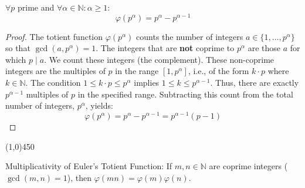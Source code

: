 \begin{proposition}
\label{prop:prime_power_formula}
$\forall p$ prime and $\forall \alpha \in \mathbb{N} : \alpha \geq 1$:
$$ \varphi(p^\alpha) = p^\alpha - p^{\alpha-1} $$
\end{proposition}
\begin{proof}
The totient function $\varphi(p^\alpha)$ counts the number of integers $a \in \{1, \dots, p^\alpha\}$ so that $\gcd(a, p^\alpha) = 1$.
The integers that are \textbf{not} coprime to $p^\alpha$ are those $a$ for which $p \mid a$. We count these integers (the complement).
These non-coprime integers are the multiples of $p$ in the range $[1, p^\alpha]$, i.e., of the form $k \cdot p$ where $k \in \mathbb{N}$.
The condition $1 \leq k \cdot p \leq p^\alpha$ implies $1 \leq k \leq p^{\alpha-1}$.
Thus, there are exactly $p^{\alpha-1}$ multiples of $p$ in the specified range.
Subtracting this count from the total number of integers, $p^\alpha$, yields:
$$ \varphi(p^\alpha) = p^\alpha - p^{\alpha-1} = p^{\alpha-1} (p - 1) $$ \qedhere
\end{proof}

\begin{center}
    \vspace{10pt}
    \line(1,0){450}
    \vspace{25pt}
\end{center}

\begin{theorem}
\label{thm:multiplicativity}
Multiplicativity of Euler's Totient Function: If $m, n \in \mathbb{N}$ are coprime integers ($\gcd(m, n) = 1$), then $\varphi(m n) = \varphi(m) \varphi(n)$.
\end{theorem}